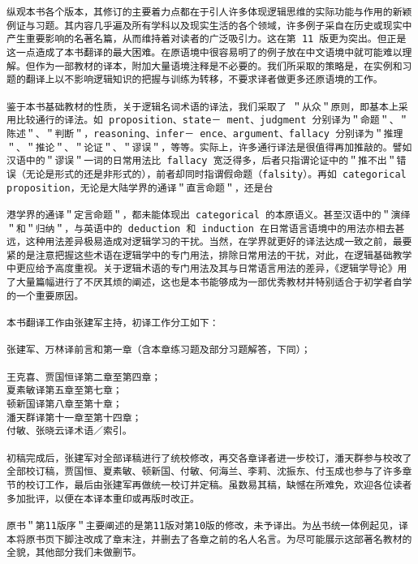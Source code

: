 \begin{verbatim}
纵观本书各个版本，其修订的主要着力点都在于引人许多体现逻辑思维的实际功能与作用的新颖例证与习题。其内容几乎遍及所有学科以及现实生活的各个领域，许多例子采自在历史或现实中产生重要影响的名著名篇，从而维持着对读者的广泛吸引力。这在第 11 版更为突出。但正是这一点造成了本书翻译的最大困难。在原语境中很容易明了的例子放在中文语境中就可能难以理解。但作为一部教材的译本，附加大量语境注释是不必要的。我们所采取的策略是，在实例和习题的翻译上以不影响逻辑知识的把握与训练为转移，不要求译者做更多还原语境的工作。

鉴于本书基础教材的性质，关于逻辑名词术语的译法，我们采取了 ＂从众＂原则，即基本上采用比较通行的译法。如 proposition、state－ ment、judgment 分别译为＂命题＂、＂陈述＂、＂判断＂，reasoning、infer－ ence、argument、fallacy 分别译为＂推理＂、＂推论＂、＂论证＂、＂谬误＂，等等。实际上，许多通行译法是很值得再加推敲的。譬如汉语中的＂谬误＂一词的日常用法比 fallacy 宽泛得多，后者只指谓论证中的＂推不出＂错误（无论是形式的还是非形式的），前者却同时指谓假命题（falsity）。再如 categorical proposition，无论是大陆学界的通译＂直言命题＂，还是台

港学界的通译＂定言命题＂，都未能体现出 categorical 的本原语义。甚至汉语中的＂演绎＂和＂归纳＂，与英语中的 deduction 和 induction 在日常语言语境中的用法亦相去甚远，这种用法差异极易造成对逻辑学习的干扰。当然，在学界就更好的译法达成一致之前，最要紧的是注意把握这些术语在逻辑学中的专门用法，排除日常用法的干扰，对此，在逻辑基础教学中更应给予高度重视。关于逻辑术语的专门用法及其与日常语言用法的差异，《逻辑学导论》用了大量篇幅进行了不厌其烦的阐述，这也是本书能够成为一部优秀教材并特别适合于初学者自学的一个重要原因。

本书翻译工作由张建军主持，初译工作分工如下：

张建军、万林译前言和第一章（含本章练习题及部分习题解答，下同）；

王克喜、贾国恒译第二章至第四章；
夏素敏译第五章至第七章；
顿新国译第八章至第十章；
潘天群译第十一章至第十四章；
付敏、张晓云译术语／索引。

初稿完成后，张建军对全部译稿进行了统校修改，再交各章译者进一步校订，潘天群参与校改了全部校订稿，贾国恒、夏素敏、顿新国、付敏、何海兰、李莉、沈振东、付玉成也参与了许多章节的校订工作，最后由张建军再做统一校订并定稿。虽数易其稿，缺憾在所难免，欢迎各位读者多加批评，以便在本译本重印或再版时改正。

原书＂第11版序＂主要阐述的是第11版对第10版的修改，未予译出。为丛书统一体例起见，译本将原书页下脚注改成了章末注，并删去了各章之前的名人名言。为尽可能展示这部著名教材的全貌，其他部分我们未做删节。


\end{verbatim}
